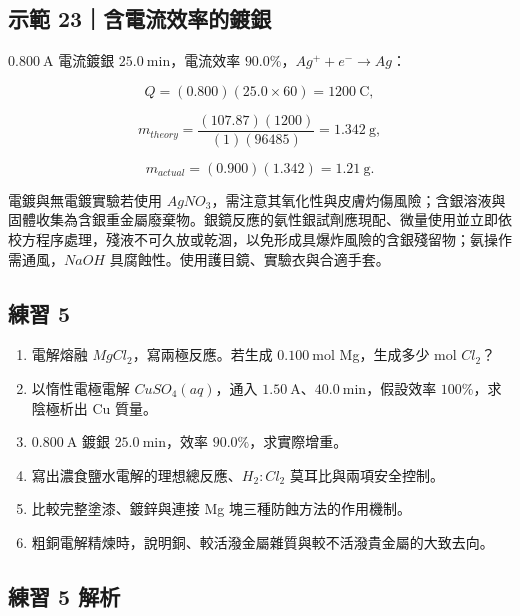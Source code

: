 \documentclass[11pt,a4paper]{article}
\providecommand{\tightlist}{%
  \setlength{\itemsep}{0pt}\setlength{\parskip}{0pt}}
\begin{document}
\begin{HandoutWorkedExample}

\subsection{示範 23｜含電流效率的鍍銀}\label{ux793aux7bc4-23ux542bux96fbux6d41ux6548ux7387ux7684ux934dux9280}

\(0.800\ \mathrm A\) 電流鍍銀 \(25.0\ \mathrm{min}\)，電流效率 \(90.0\%\)，\(Ag^++e^-\rightarrow Ag\)：

\[
Q=(0.800)(25.0\times60)=1200\ \mathrm C,
\]

\[
m_{theory}=\frac{(107.87)(1200)}{(1)(96485)}=1.342\ \mathrm g,
\]

\[
m_{actual}=(0.900)(1.342)=1.21\ \mathrm g.
\]

\end{HandoutWorkedExample}

電鍍與無電鍍實驗若使用 \(AgNO_3\)，需注意其氧化性與皮膚灼傷風險；含銀溶液與固體收集為含銀重金屬廢棄物。銀鏡反應的氨性銀試劑應現配、微量使用並立即依校方程序處理，殘液不可久放或乾涸，以免形成具爆炸風險的含銀殘留物；氨操作需通風，\(NaOH\) 具腐蝕性。使用護目鏡、實驗衣與合適手套。

\subsection{練習 5}\label{ux7df4ux7fd2-5}

\begin{enumerate}
\def\labelenumi{\arabic{enumi}.}
\tightlist
\item
  電解熔融 \(MgCl_2\)，寫兩極反應。若生成 \(0.100\ \mathrm{mol}\) Mg，生成多少 mol \(Cl_2\)？
\item
  以惰性電極電解 \(CuSO_4(aq)\)，通入 \(1.50\ \mathrm A\)、\(40.0\ \mathrm{min}\)，假設效率 \(100\%\)，求陰極析出 Cu 質量。
\item
  \(0.800\ \mathrm A\) 鍍銀 \(25.0\ \mathrm{min}\)，效率 \(90.0\%\)，求實際增重。
\item
  寫出濃食鹽水電解的理想總反應、\(H_2:Cl_2\) 莫耳比與兩項安全控制。
\item
  比較完整塗漆、鍍鋅與連接 Mg 塊三種防蝕方法的作用機制。
\item
  粗銅電解精煉時，說明銅、較活潑金屬雜質與較不活潑貴金屬的大致去向。
\end{enumerate}

\subsection{練習 5 解析}\label{ux7df4ux7fd2-5-ux89e3ux6790}
\end{document}
